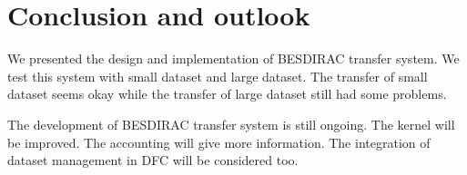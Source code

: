\section{Conclusion and outlook}
We presented the design and implementation of BESDIRAC transfer system.
We test this system with small dataset and large dataset.
The transfer of small dataset seems okay while the transfer of large
dataset still had some problems.

The development of BESDIRAC transfer system is still ongoing.
The kernel will be improved.
The accounting will give more information.
The integration of dataset management in DFC will be considered too.
